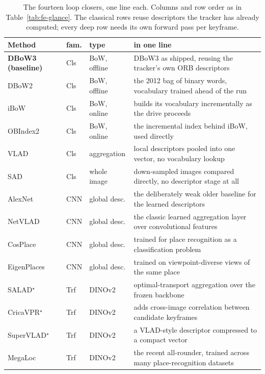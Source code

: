 \begin{table}[H]
\centering
\caption{The fourteen loop closers, one line each. Columns and row order as in Table~\ref{tab:fe-glance}. The classical rows reuse descriptors the tracker has already computed; every deep row needs its own forward pass per keyframe.}
\label{tab:lc-glance}
\footnotesize
\setlength{\tabcolsep}{4pt}
\begin{tabular}{@{}llp{1.9cm}p{6.5cm}@{}}
\toprule
\textbf{Method} & \textbf{fam.} & \textbf{type} & \textbf{in one line} \\
\midrule
\textbf{DBoW3 (baseline)} \cite{galvezlopez2012dbow2} & Cls & BoW, offline & DBoW3 as shipped, reusing the tracker's own ORB descriptors \\
DBoW2 \cite{galvezlopez2012dbow2} & Cls & BoW, offline & the 2012 bag of binary words, vocabulary trained ahead of the run \\
iBoW \cite{garciafidalgo2018ibow} & Cls & BoW, online & builds its vocabulary incrementally as the drive proceeds \\
OBIndex2 \cite{garciafidalgo2018ibow} & Cls & BoW, online & the incremental index behind iBoW, used directly \\
VLAD \cite{jegou2010vlad} & Cls & aggregation & local descriptors pooled into one vector, no vocabulary lookup \\
SAD & Cls & whole image & down-sampled images compared directly, no descriptor stage at all \\
\addlinespace[2pt]
AlexNet \cite{krizhevsky2012alexnet} & CNN & global desc. & the deliberately weak older baseline for the learned descriptors \\
NetVLAD \cite{arandjelovic2016netvlad} & CNN & global desc. & the classic learned aggregation layer over convolutional features \\
CosPlace \cite{berton2022cosplace} & CNN & global desc. & trained for place recognition as a classification problem \\
EigenPlaces \cite{berton2023eigenplaces} & CNN & global desc. & trained on viewpoint-diverse views of the same place \\
\addlinespace[2pt]
SALAD$^\star$ \cite{izquierdo2024salad} & Trf & DINOv2 & optimal-transport aggregation over the frozen backbone \\
CricaVPR$^\star$ \cite{lu2024cricavpr} & Trf & DINOv2 & adds cross-image correlation between candidate keyframes \\
SuperVLAD$^\star$ \cite{lu2024supervlad} & Trf & DINOv2 & a VLAD-style descriptor compressed to a compact vector \\
MegaLoc \cite{berton2025megaloc} & Trf & DINOv2 & the recent all-rounder, trained across many place-recognition datasets \\
\bottomrule
\end{tabular}
\end{table}

